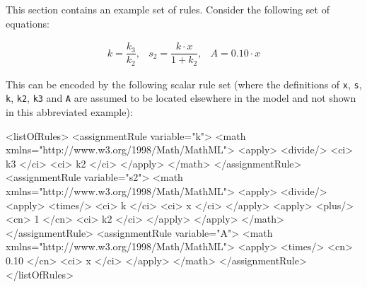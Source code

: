 This section contains an example set of rules.  Consider the
following set of equations:
\begin{linenomath}
  \begin{equation*}
    \begin{array}{lll}
      k = \dfrac{k_3}{k_2}, & s_2 = \dfrac{k \cdot x}{1 + k_2}, & A = 0.10 \cdot x
    \end{array}
  \end{equation*}
\end{linenomath}
This can be encoded by the following scalar rule set (where the
definitions of \texttt{x}, \texttt{s}, \texttt{k}, \texttt{k2},
\texttt{k3} and \texttt{A} are assumed to be located elsewhere in
the model and not shown in this abbreviated example):

\begin{example}
    <listOfRules>
        <assignmentRule variable="k">
            <math xmlns="http://www.w3.org/1998/Math/MathML">
                <apply> <divide/> <ci> k3 </ci> <ci> k2 </ci> </apply>
            </math>
        </assignmentRule>
        <assignmentRule variable="s2">
            <math xmlns="http://www.w3.org/1998/Math/MathML">
                <apply>
                    <divide/>
                        <apply> <times/> <ci> k </ci> <ci> x </ci> </apply>
                        <apply> <plus/> <cn> 1 </cn> <ci> k2 </ci> </apply>
                </apply>
            </math>
        </assignmentRule>
        <assignmentRule variable="A">
            <math xmlns="http://www.w3.org/1998/Math/MathML">
                <apply> <times/> <cn> 0.10 </cn> <ci> x </ci> </apply>
            </math>
        </assignmentRule>
    </listOfRules>
\end{example}


